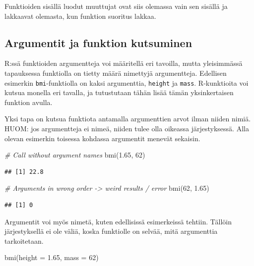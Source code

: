 \documentclass[
]{book}
\newenvironment{Shaded}{\begin{snugshade}}{\end{snugshade}}
\newcommand{\AttributeTok}[1]{\textcolor[rgb]{0.77,0.63,0.00}{#1}}
\newcommand{\CommentTok}[1]{\textcolor[rgb]{0.56,0.35,0.01}{\textit{#1}}}
\newcommand{\DecValTok}[1]{\textcolor[rgb]{0.00,0.00,0.81}{#1}}
\newcommand{\FloatTok}[1]{\textcolor[rgb]{0.00,0.00,0.81}{#1}}
\newcommand{\FunctionTok}[1]{\textcolor[rgb]{0.00,0.00,0.00}{#1}}
\newcommand{\NormalTok}[1]{#1}
\begin{document}
Funktioiden sisällä luodut muuttujat ovat siis olemassa vain sen sisällä ja lakkaavat olemasta, kun funktion suoritus lakkaa.

\hypertarget{argumentit-ja-funktion-kutsuminen}{%
\subsection{Argumentit ja funktion kutsuminen}\label{argumentit-ja-funktion-kutsuminen}}

R:ssä funktioiden argumentteja voi määritellä eri tavoilla, mutta yleisimmässä tapauksessa funktiolla on tietty määrä nimettyjä argumentteja. Edellisen esimerkin \texttt{bmi}-funktiolla on kaksi argumenttia, \texttt{height} ja \texttt{mass}. R-kunktioita voi kutsua monella eri tavalla, ja tutustutaan tähän lisää tämän yksinkertaisen funktion avulla.

Yksi tapa on kutsua funktiota antamalla argumenttien arvot ilman niiden nimiä. HUOM: jos argumentteja ei nimeä, niiden tulee olla oikeassa järjestyksessä. Alla olevan esimerkin toisessa kohdassa argumentit menevät sekaisin.

\begin{Shaded}
\begin{Highlighting}[]
\CommentTok{\# Call without argument names}
\FunctionTok{bmi}\NormalTok{(}\FloatTok{1.65}\NormalTok{, }\DecValTok{62}\NormalTok{)}
\end{Highlighting}
\end{Shaded}

\begin{verbatim}
## [1] 22.8
\end{verbatim}

\begin{Shaded}
\begin{Highlighting}[]
\CommentTok{\# Arguments in wrong order {-}\textgreater{} weird results / error}
\FunctionTok{bmi}\NormalTok{(}\DecValTok{62}\NormalTok{, }\FloatTok{1.65}\NormalTok{)}
\end{Highlighting}
\end{Shaded}

\begin{verbatim}
## [1] 0
\end{verbatim}

Argumentit voi myös nimetä, kuten edellisissä esimerkeissä tehtiin. Tällöin järjestyksellä ei ole väliä, koska funktiolle on selvää, mitä argumenttia tarkoitetaan.

\begin{Shaded}
\begin{Highlighting}[]
\FunctionTok{bmi}\NormalTok{(}\AttributeTok{height =} \FloatTok{1.65}\NormalTok{, }\AttributeTok{mass =} \DecValTok{62}\NormalTok{)}
\end{Highlighting}
\end{Shaded}
\end{document}
